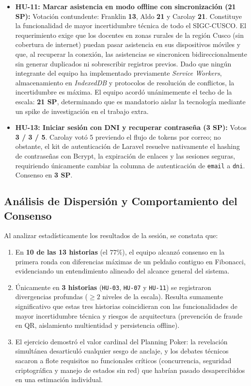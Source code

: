 \begin{itemize}
    \item \textbf{HU-11: Marcar asistencia en modo offline con sincronización (21 SP):} Votación contundente: Franklin \textbf{13}, Aldo \textbf{21} y Carolay \textbf{21}. Constituye la funcionalidad de mayor incertidumbre técnica de todo el SIGC-CUSCO. El requerimiento exige que los docentes en zonas rurales de la región Cusco (sin cobertura de internet) puedan pasar asistencia en sus dispositivos móviles y que, al recuperar la conexión, las asistencias se sincronicen bidireccionalmente sin generar duplicados ni sobrescribir registros previos. Dado que ningún integrante del equipo ha implementado previamente \textit{Service Workers}, almacenamiento en \textit{IndexedDB} y protocolos de resolución de conflictos, la incertidumbre es máxima. El equipo acordó unánimemente el techo de la escala: \textbf{21 SP}, determinando que es mandatorio aislar la tecnología mediante un spike de investigación en el trabajo extra.
    
    \item \textbf{HU-13: Iniciar sesión con DNI y recuperar contraseña (3 SP):} Votos \textbf{3 / 3 / 5}. Carolay votó 5 previendo el flujo de tokens por correo; no obstante, el kit de autenticación de Laravel resuelve nativamente el hashing de contraseñas con Bcrypt, la expiración de enlaces y las sesiones seguras, requiriendo únicamente cambiar la columna de autenticación de \texttt{email} a \texttt{dni}. Consenso en \textbf{3 SP}.
\end{itemize}

\subsection{Análisis de Dispersión y Comportamiento del Consenso}

Al analizar estadísticamente los resultados de la sesión, se constata que:
\begin{enumerate}
    \item En \textbf{10 de las 13 historias} (el $77\%$), el equipo alcanzó consenso en la primera ronda con diferencias máximas de un peldaño contiguo en Fibonacci, evidenciando un entendimiento alineado del alcance general del sistema.
    \item Únicamente en \textbf{3 historias} (\texttt{HU-03}, \texttt{HU-07} y \texttt{HU-11}) se registraron divergencias profundas ($\ge 2$ niveles de la escala). Resulta sumamente significativo que estas tres historias coincidieran con las funcionalidades de mayor incertidumbre técnica y riesgos de arquitectura (prevención de fraude en QR, aislamiento multientidad y persistencia offline).
    \item El ejercicio demostró el valor cardinal del Planning Poker: la revelación simultánea desarticuló cualquier sesgo de anclaje, y los debates técnicos sacaron a flote requisitos no funcionales críticos (concurrencia, seguridad criptográfica y manejo de estados sin red) que habrían pasado desapercibidos en una estimación individual.
\end{enumerate}
